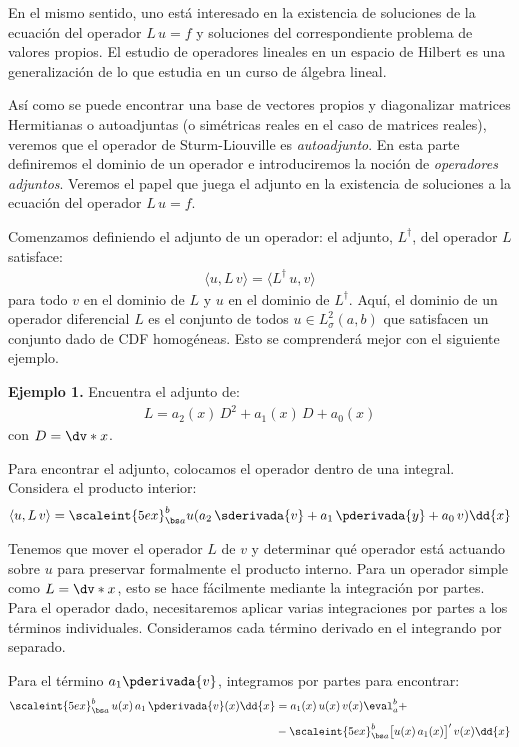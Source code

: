 En el mismo sentido, uno está interesado en la existencia de soluciones de la ecuación del operador $L \, u = f$ y soluciones del correspondiente problema de valores propios. El estudio de operadores lineales en un espacio de Hilbert es una generalización de lo que estudia en un curso de álgebra lineal.
\par
Así como se puede encontrar una base de vectores propios y diagonalizar matrices Hermitianas o autoadjuntas (o simétricas reales en el caso de matrices reales), veremos que el operador de Sturm-Liouville es \emph{autoadjunto}. En esta parte definiremos el dominio de un operador e introduciremos la noción de \emph{operadores adjuntos}. Veremos el papel que juega el adjunto en la existencia de soluciones a la ecuación del operador $L \, u = f$.
\par
Comenzamos definiendo el adjunto de un operador: el adjunto, $L^{\dagger}$, del operador $L$ satisface:
\begin{align*}
\langle u, L \, v \rangle = \langle L^{\dagger} \, u,  v \rangle
\end{align*}
para todo $v$ en el dominio de $L$ y $u$ en el dominio de $L^{\dagger}$. Aquí, el dominio de un operador diferencial $L$ es el conjunto de todos $u \in L_{\sigma}^{2} (a, b)$ que satisfacen un conjunto dado de CDF homogéneas. Esto se comprenderá mejor con el siguiente ejemplo.
\par
\noindent
\textbf{Ejemplo 1.} Encuentra el adjunto de:
\begin{align*}
L = a_{2}(x) \, D^{2} + a_{1}(x) \, D + a_{0}(x)
\end{align*}
con $D = \dv*{x}$.
\par
\noindent
Para encontrar el adjunto, colocamos el operador dentro de una integral. Considera el producto interior:
\begin{align*}
\langle u , L \, v \rangle = \scaleint{5ex}_{\bs a}^{b} u (a_{2} \, \sderivada{v} + a_{1} \, \pderivada{y} + a_{0} \, v) \dd{x}
\end{align*}

Tenemos que mover el operador $L$ de $v$ y determinar qué operador está actuando sobre $u$ para preservar formalmente el producto interno. Para un operador simple como $L = \dv*{x}$, esto se hace fácilmente mediante la integración por partes. Para el operador dado, necesitaremos aplicar varias integraciones por partes a los términos individuales. Consideramos cada término derivado en el integrando por separado.
\par
Para el término $a_{1} \pderivada{v}$, integramos por partes para encontrar:
\begin{align}
\begin{aligned}[b]
\scaleint{5ex}_{\bs a}^{b} \, u(x) \, a_{1} \, \pderivada{v}(x) \dd{x} &= a_{1}(x) \, u(x) \, v(x) \eval_{a}^{b} + \\[0.5em]
&- \scaleint{5ex}_{\bs a}^{b} \big[ u(x) \, a_{1} (x) \big]^{\prime} \, v(x) \dd{x}
\end{aligned}
\label{eq:ecuacion_04_17}
\end{align}

